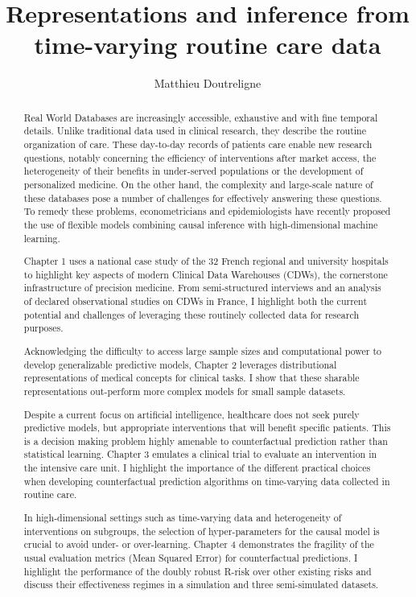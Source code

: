 \documentclass{report}
\title{
  Representations and inference from time-varying routine care data 
}
\author{
  Matthieu Doutreligne \\
}
\begin{document}
\maketitle


\begin{abstract}

  Real World Databases are increasingly accessible, exhaustive and with
  fine temporal details. Unlike traditional data used in clinical research, they
  describe the routine organization of care. These day-to-day records of
  patients care enable new research questions, notably concerning the efficiency
  of interventions after market access, the heterogeneity of their benefits in
  under-served populations or the development of personalized medicine. On the
  other hand, the complexity and large-scale nature of these databases pose a
  number of challenges for effectively answering these questions. To remedy
  these problems, econometricians and epidemiologists have recently proposed
  the use of flexible models combining causal inference with high-dimensional
  machine learning.

  Chapter 1 uses a national case study of the 32 French regional and
  university hospitals to highlight key aspects of modern Clinical Data
  Warehouses (CDWs), the cornerstone infrastructure of precision medicine. From
  semi-structured interviews and an analysis of declared observational studies
  on CDWs in France, I highlight both the current potential and challenges of
  leveraging these routinely collected data for research purposes.

  Acknowledging the difficulty to access large sample sizes and computational
  power to develop generalizable predictive models, Chapter 2 leverages
  distributional representations of medical concepts for clinical tasks. I show
  that these sharable representations out-perform more complex models for
  small sample datasets.

  Despite a current focus on artificial intelligence, healthcare does not seek
  purely predictive models, but appropriate interventions that will benefit
  specific patients. This is a decision making problem highly amenable to
  counterfactual prediction rather than statistical learning. Chapter 3 emulates
  a clinical trial to evaluate an intervention in the intensive care unit. I
  highlight the importance of the different practical choices when developing
  counterfactual prediction algorithms on time-varying data collected in routine
  care.

  In high-dimensional settings such as time-varying data and heterogeneity of
  interventions on subgroups, the selection of hyper-parameters for the causal
  model is crucial to avoid under- or over-learning. Chapter 4 demonstrates the
  fragility of the usual evaluation metrics (Mean Squared Error) for
  counterfactual predictions. I highlight the performance of the doubly robust
  R-risk over other existing risks and discuss their effectiveness regimes in a
  simulation and three semi-simulated datasets.


\end{abstract}
\end{document}
